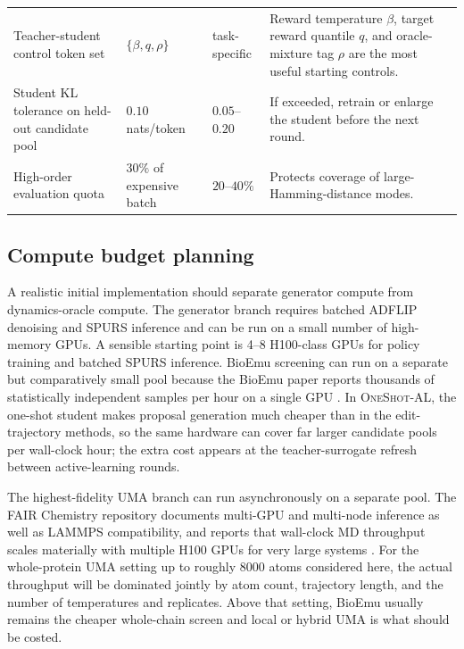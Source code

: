 \documentclass[11pt]{article}
\newcommand{\methodIII}{\textsc{OneShot-AL}}
\begin{document}
\begin{table}[H]
\begin{tabularx}{\textwidth}{>{\raggedright\arraybackslash}p{} >{\centering\arraybackslash}p{} >{\centering\arraybackslash}p{} X}
			Teacher-student control token set & $\{\beta, q, \rho\}$ & task-specific & Reward temperature $\beta$, target reward quantile $q$, and oracle-mixture tag $\rho$ are the most useful starting controls. \\
			Student KL tolerance on held-out candidate pool & $0.10$ nats/token & $0.05$--$0.20$ & If exceeded, retrain or enlarge the student before the next round. \\
			High-order evaluation quota & $30\%$ of expensive batch & $20$--$40\%$ & Protects coverage of large-Hamming-distance modes. \\
			\bottomrule
		\end{tabularx}
	\end{table}
	
	\subsection{Compute budget planning}
	
	A realistic initial implementation should separate generator compute from dynamics-oracle compute. The generator branch requires batched ADFLIP denoising and SPURS inference and can be run on a small number of high-memory GPUs. A sensible starting point is 4--8 H100-class GPUs for policy training and batched SPURS inference. BioEmu screening can run on a separate but comparatively small pool because the BioEmu paper reports thousands of statistically independent samples per hour on a single GPU \citep{lewis2024bioemu}. In \methodIII{}, the one-shot student makes proposal generation much cheaper than in the edit-trajectory methods, so the same hardware can cover far larger candidate pools per wall-clock hour; the extra cost appears at the teacher-surrogate refresh between active-learning rounds.
	
	The highest-fidelity UMA branch can run asynchronously on a separate pool. The FAIR Chemistry repository documents multi-GPU and multi-node inference as well as LAMMPS compatibility, and reports that wall-clock MD throughput scales materially with multiple H100 GPUs for very large systems \citep{fairchem2025github}. For the whole-protein UMA setting up to roughly $8000$ atoms considered here, the actual throughput will be dominated jointly by atom count, trajectory length, and the number of temperatures and replicates. Above that setting, BioEmu usually remains the cheaper whole-chain screen and local or hybrid UMA is what should be costed.
	
\end{document}
